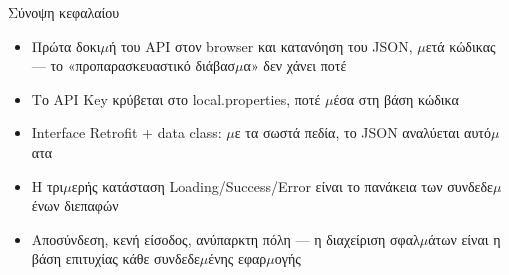 \begin{tcbsummary}{Σύνοψη κεφαλαίου}
\begin{itemize}
  \item Πρώτα δοκι$\mu$ή του API στον browser και κατανόηση του JSON, $\mu$ετά κώδικας — το «προπαρασκευαστικό διάβασ$\mu$α» δεν χάνει ποτέ
  \item Το API Key κρύβεται στο local.properties, ποτέ $\mu$έσα στη βάση κώδικα
  \item Interface Retrofit + data class: $\mu$ε τα σωστά πεδία, το JSON αναλύεται αυτό$\mu$ατα
  \item Η τρι$\mu$ερής κατάσταση Loading/Success/Error είναι το πανάκεια των συνδεδε$\mu$ένων διεπαφών
  \item Αποσύνδεση, κενή είσοδος, ανύπαρκτη πόλη — η διαχείριση σφαλ$\mu$άτων είναι η βάση επιτυχίας κάθε συνδεδε$\mu$ένης εφαρ$\mu$ογής
\end{itemize}

\end{tcbsummary}
